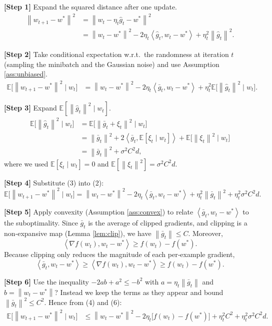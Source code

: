 \documentclass[11pt]{article}
\newcommand{\E}{\mathbb{E}}
\newcommand{\norm}[1]{\left\|#1\right\|}
\newcommand{\inner}[2]{\left\langle #1,#2\right\rangle}
\begin{document}
\noindent\textbf{[Step 1]} Expand the squared distance after one update.
\[
\begin{aligned}
\norm{w_{t+1}-w^{*}}^{2}
&= \norm{w_{t}-\eta_{t}\hat g_{t}-w^{*}}^{2}\\
&= \norm{w_{t}-w^{*}}^{2}
   -2\eta_{t}\inner{\hat g_{t}}{w_{t}-w^{*}}
   +\eta_{t}^{2}\norm{\hat g_{t}}^{2}. \tag{1}
\end{aligned}
\]

\noindent\textbf{[Step 2]} Take conditional expectation w.r.t.\ the randomness at iteration $t$ (sampling the minibatch and the Gaussian noise) and use Assumption \ref{ass:unbiased}.
\[
\begin{aligned}
\E\!\bigl[\norm{w_{t+1}-w^{*}}^{2}\mid w_{t}\bigr]
&= \norm{w_{t}-w^{*}}^{2}
   -2\eta_{t}\inner{\bar g_{t}}{w_{t}-w^{*}}
   +\eta_{t}^{2}\E\!\bigl[\norm{\hat g_{t}}^{2}\mid w_{t}\bigr]. \tag{2}
\end{aligned}
\]

\noindent\textbf{[Step 3]} Expand $\E[\norm{\hat g_{t}}^{2}\mid w_{t}]$.
\[
\begin{aligned}
\E\!\bigl[\norm{\hat g_{t}}^{2}\mid w_{t}\bigr]
&= \E\!\bigl[\norm{\bar g_{t}+\xi_{t}}^{2}\mid w_{t}\bigr]\\
&= \norm{\bar g_{t}}^{2}
   +2\inner{\bar g_{t}}{\E[\xi_{t}\mid w_{t}]}
   +\E\!\bigl[\norm{\xi_{t}}^{2}\mid w_{t}\bigr] \\
&= \norm{\bar g_{t}}^{2}+ \sigma^{2}C^{2}d, \tag{3}
\end{aligned}
\]
where we used $\E[\xi_{t}\mid w_{t}]=0$ and $\E[\norm{\xi_{t}}^{2}]=\sigma^{2}C^{2}d$.

\noindent\textbf{[Step 4]} Substitute (3) into (2):
\[
\E\!\bigl[\norm{w_{t+1}-w^{*}}^{2}\mid w_{t}\bigr]
= \norm{w_{t}-w^{*}}^{2}
   -2\eta_{t}\inner{\bar g_{t}}{w_{t}-w^{*}}
   +\eta_{t}^{2}\norm{\bar g_{t}}^{2}
   +\eta_{t}^{2}\sigma^{2}C^{2}d. \tag{4}
\]

\noindent\textbf{[Step 5]} Apply convexity (Assumption \ref{ass:convex}) to relate $\inner{\bar g_{t}}{w_{t}-w^{*}}$ to the suboptimality.
Since $\bar g_{t}$ is the average of clipped gradients, and clipping is a non‑expansive map (Lemma \ref{lem:clip}), we have $\norm{\bar g_{t}}\le C$.
Moreover,
\[
\inner{\nabla f(w_{t})}{w_{t}-w^{*}} \ge f(w_{t})-f(w^{*}). \tag{5}
\]
Because clipping only reduces the magnitude of each per‑example gradient,
\[
\inner{\bar g_{t}}{w_{t}-w^{*}} \ge \inner{\nabla f(w_{t})}{w_{t}-w^{*}} \ge f(w_{t})-f(w^{*}). \tag{6}
\]

\noindent\textbf{[Step 6]} Use the inequality $-2ab + a^{2} \le -b^{2}$ with $a=\eta_{t}\norm{\bar g_{t}}$ and $b= \norm{w_{t}-w^{*}}$? Instead we keep the terms as they appear and bound $\norm{\bar g_{t}}^{2}\le C^{2}$. Hence from (4) and (6):
\[
\begin{aligned}
\E\!\bigl[\norm{w_{t+1}-w^{*}}^{2}\mid w_{t}\bigr]
&\le \norm{w_{t}-w^{*}}^{2}
   -2\eta_{t}\bigl[f(w_{t})-f(w^{*})\bigr]
   +\eta_{t}^{2}C^{2}
   +\eta_{t}^{2}\sigma^{2}C^{2}d. \tag{7}
\end{aligned}
\]
\end{document}
